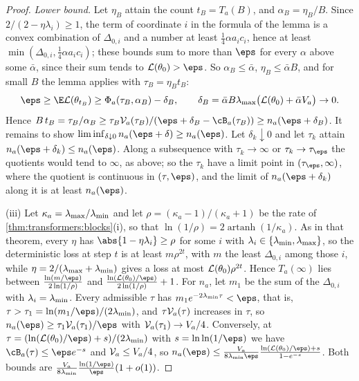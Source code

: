 \begin{refsection}
\begin{proof}
\emph{Lower bound.} Let $\eta_B$ attain the count $t_B=T_a(B)$, and $\alpha_B=\eta_B/B$. Since $2/(2-\eta\lambda_i)\ge1$, the term of coordinate $i$ in the formula of the lemma is a convex combination of $\Delta_{0,i}$ and a number at least $\frac14\alpha a_ic_i$, hence at least $\min(\Delta_{0,i},\frac14\alpha a_ic_i)$; these bounds sum to more than $\eps$ for every $\alpha$ above some $\bar\alpha$, since their sum tends to $\Loss(\theta_0)>\eps$. So $\alpha_B\le\bar\alpha$, $\eta_B\le\bar\alpha B$, and for small $B$ the lemma applies with $\tau_B=\eta_Bt_B$:
\[
  \eps\ge\E\Loss(\theta_{t_B})\ge\Phi_a(\tau_B,\alpha_B)-\delta_B,\qquad\delta_B=\bar\alpha B\lmax\bigl(\Loss(\theta_0)+\bar\alpha V_a\bigr)\to0 .
\]
Hence $B\,t_B=\tau_B/\alpha_B\ge\tau_B\cV_a(\tau_B)/(\eps+\delta_B-\cB_a(\tau_B))\ge n_a(\eps+\delta_B)$. It remains to show $\liminf_{\delta\downarrow0}n_a(\eps+\delta)\ge n_a(\eps)$. Let $\delta_k\downarrow0$ and let $\tau_k$ attain $n_a(\eps+\delta_k)\le n_a(\eps)$. Along a subsequence with $\tau_k\to\infty$ or $\tau_k\to\tau_\eps$ the quotients would tend to $\infty$, as above; so the $\tau_k$ have a limit point in $(\tau_\eps,\infty)$, where the quotient is continuous in $(\tau,\eps)$, and the limit of $n_a(\eps+\delta_k)$ along it is at least $n_a(\eps)$.

(iii) Let $\kappa_a=\lambda_{\max}/\lambda_{\min}$ and let $\rho=(\kappa_a-1)/(\kappa_a+1)$ be the rate of \cref{thm:transformers:blocks}(i), so that $\ln(1/\rho)=2\operatorname{artanh}(1/\kappa_a)$. As in that theorem, every $\eta$ has $\abs{1-\eta\lambda_i}\ge\rho$ for some $i$ with $\lambda_i\in\{\lambda_{\min},\lambda_{\max}\}$, so the deterministic loss at step $t$ is at least $m\rho^{2t}$, with $m$ the least $\Delta_{0,i}$ among those $i$, while $\eta=2/(\lambda_{\max}+\lambda_{\min})$ gives a loss at most $\mathcal{L}(\theta_0)\rho^{2t}$. Hence $T_a(\infty)$ lies between $\frac{\ln(m/\eps)}{2\ln(1/\rho)}$ and $\frac{\ln(\Loss(\theta_0)/\eps)}{2\ln(1/\rho)}+1$. For $n_a$, let $m_1$ be the sum of the $\Delta_{0,i}$ with $\lambda_i=\lambda_{\min}$. Every admissible $\tau$ has $m_1e^{-2\lmin\tau}<\eps$, that is, $\tau>\tau_1=\ln(m_1/\eps)/(2\lmin)$, and $\tau\mathcal{V}_a(\tau)$ increases in $\tau$, so $n_a(\eps)\ge\tau_1\cV_a(\tau_1)/\eps$ with $\mathcal{V}_a(\tau_1)\to V_a/4$. Conversely, at $\tau=(\ln(\Loss(\theta_0)/\eps)+s)/(2\lmin)$ with $s=\ln\ln(1/\eps)$ we have $\cB_a(\tau)\le\eps e^{-s}$ and $\mathcal{V}_a\le V_a/4$, so $n_a(\eps)\le\frac{V_a}{8\lmin\eps}\frac{\ln(\Loss(\theta_0)/\eps)+s}{1-e^{-s}}$. Both bounds are $\frac{V_a}{8\lmin}\frac{\ln(1/\eps)}\eps(1+o(1))$.
\end{proof}


\end{refsection}
